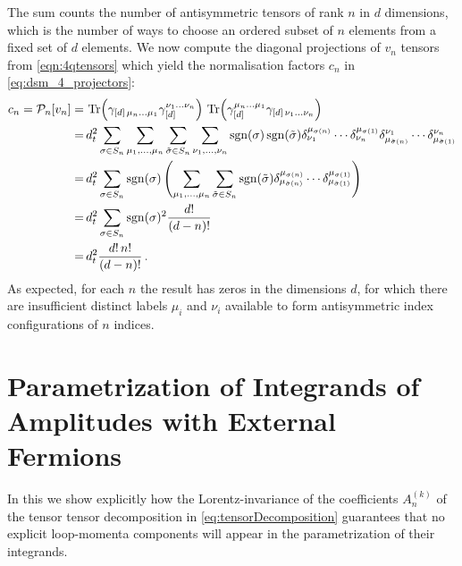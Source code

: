 The sum counts the number of antisymmetric tensors of
rank $n$ in $d$ dimensions, which is the number of ways to 
choose an ordered subset of $n$ elements from a fixed set of $d$
elements.
%
We now compute the diagonal projections of $v_n$ tensors from \cref{eqn:4qtensors}
which yield the normalisation factors $c_n$ in \cref{eq:dsm_4_projectors}:
\begin{align}
  \begin{split}
    \label{eq:cnCalc}
    c_n=\mathcal{P}_n [v_n] =&\,
%
    \Tr(\gamma_{[d]\,\mu_n \ldots \mu_1} \gamma_{[d]}^
    {\nu_1 \ldots \nu_n}) \,
%
    \Tr(\gamma_{[d]}^{\mu_n \ldots \mu_1} \gamma_{
    [d]\,\nu_1 \ldots \nu_n}) \\
    =&\,
    d_t^2 \sum_{\sigma\in  S_n} 
    \sum_{\mu_1,\ldots,\mu_n}
    \sum_{\tilde \sigma\in S_n}
    \sum_{\nu_1,\ldots,\nu_n}
%
    \sgn(\sigma)
    \sgn(\tilde\sigma)
    \delta^{\mu_{\sigma(n)}}_{\nu_1}\cdots\delta^{\mu_{\sigma(1)}}_{\nu_n}
    \delta_{\mu_{\tilde\sigma(n)}}^{\nu_1}\cdots
    \delta_{\mu_{\tilde\sigma(1)}}^{\nu_n}
    \\
%
    =&\,d_t^2 \sum_{\sigma\in  S_n} 
    \sgn(\sigma)
    \left(
    \sum_{\mu_1,\ldots,\mu_n}\sum_{\tilde \sigma\in S_n}
%
    \sgn(\tilde\sigma)
    \delta^{\mu_{\sigma(n)}}_{\mu_{\tilde\sigma(n)}}
    \cdots
    \delta^{\mu_{\sigma(1)}}_{\mu_{\tilde\sigma(1)}}
    \right)
    \\
%
    =&\, d_t^2 \sum_{\sigma\in  S_n} 
    \sgn(\sigma)^2 \frac{d!}{(d-n)!}\\
    =&\, d_t^2 \frac{d!\,n!}{(d-n)!}\,.
  \end{split}
\end{align}
As expected, for each $n$ the result has zeros in the dimensions
$d$, for which there are insufficient distinct labels 
$\mu_i$ and $\nu_i$ available to form antisymmetric index 
configurations of $n$ indices.



\chapter{Parametrization of Integrands of Amplitudes with External Fermions}
\label{sec:ParamIntegrands}

In this  we show
explicitly how the Lorentz-invariance of the coefficients $A_n^{(k)}$ of the
tensor tensor decomposition in \cref{eq:tensorDecomposition} guarantees that
no explicit loop-momenta components will appear in the parametrization of their integrands.


